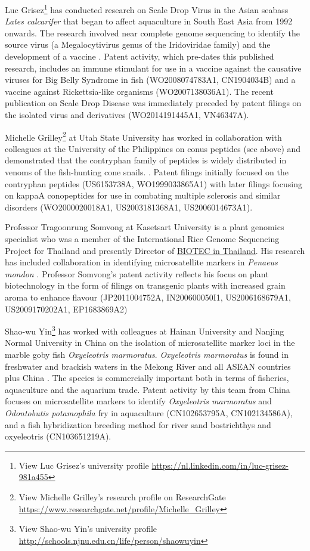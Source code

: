 \documentclass[openany]{book}
\let\rmarkdownfootnote\footnote%
\def\footnote{\protect\rmarkdownfootnote}
\theoremstyle{definition}
\theoremstyle{definition}
\theoremstyle{definition}
\theoremstyle{remark}
\begin{document}
Luc Grisez\footnote{View Luc Grisez's university profile
  \url{https://nl.linkedin.com/in/luc-grisez-981a455}} has conducted
research on Scale Drop Virus in the Asian seabass \emph{Lates
calcarifer} that began to affect aquaculture in South East Asia from
1992 onwards. The research involved near complete genome sequencing to
identify the source virus (a Megalocytivirus genus of the Iridoviridae
family) and the development of a vaccine \citep{de_Groof_2015}. Patent
activity, which pre-dates this published research, includes an immune
stimulant for use in a vaccine against the causative viruses for Big
Belly Syndrome in fish (WO2008074783A1, CN1904034B) and a vaccine
against Rickettsia-like organisms (WO2007138036A1). The recent
publication on Scale Drop Disease was immediately preceded by patent
filings on the isolated virus and derivatives (WO2014191445A1,
VN46347A).

Michelle Grilley\footnote{View Michelle Grilley's research profile on
  ResearchGate
  \url{https://www.researchgate.net/profile/Michelle_Grilley}} at Utah
State University has worked in collaboration with colleagues at the
University of the Philippines on conus peptides (see above) and
demonstrated that the contryphan family of peptides is widely
distributed in venoms of the fish-hunting cone snails. \citep[originally
published 1998]{Jacobsen_2009}. Patent filings initially focused on the
contryphan peptides (US6153738A, WO1999033865A1) with later filings
focusing on kappaA conopeptides for use in combating multiple sclerosis
and similar disorders (WO2000020018A1, US2003181368A1, US2006014673A1).

Professor Tragoonrung Somvong at Kasetsart University is a plant
genomics specialist who was a member of the International Rice Genome
Sequencing Project for Thailand and presently Director of
\href{http://www.biotec.or.th/en/index.php/about-us/management-team}{BIOTEC
in Thailand}. His research has included collaboration in identifying
microsatellite markers in \emph{Penaeus mondon}
\citep{Wuthisuthimethavee_2003}. Professor Somvong's patent activity
reflects his focus on plant biotechnology in the form of filings on
transgenic plants with increased grain aroma to enhance flavour
(JP2011004752A, IN200600050I1, US2006168679A1, US2009170202A1,
EP1683869A2)

Shao-wu Yin\footnote{View Shao-wu Yin's university profile
  \url{http://schools.njnu.edu.cn/life/person/shaowuyin}} has worked
with colleagues at Hainan University and Nanjing Normal University in
China on the isolation of microsatellite marker loci in the marble goby
fish \emph{Oxyeleotris marmoratus}. \emph{Oxyeleotris marmoratus} is
found in freshwater and brackish waters in the Mekong River and all
ASEAN countries plus China \citep{Oxyeleotris_2011}. The species is
commercially important both in terms of fisheries, aquaculture and the
aquarium trade. Patent activity by this team from China focuses on
microsatellite markers to identify \emph{Oxyeleotris marmoratus} and
\emph{Odontobutis potamophila} fry in aquaculture (CN102653795A,
CN102134586A), and a fish hybridization breeding method for river sand
bostrichthys and oxyeleotris (CN103651219A).
\end{document}
